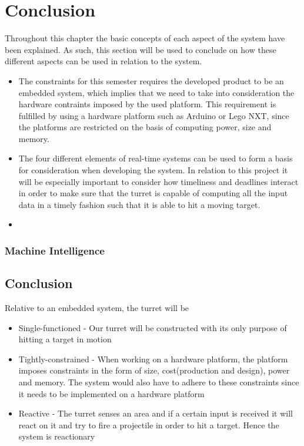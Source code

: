 \section{Conclusion}\label{EmbConc}

Throughout this chapter the basic concepts of each aspect of the system have
been explained. As such, this section will be used to conclude on how these
different aspects can be used in relation to the \name system.

\begin{itemize}
  \item The constraints for this semester requires the developed product to be
  an embedded system, which implies that we need to take into consideration
  the hardware contraints imposed by the used platform. This requirement is
  fulfilled by using a hardware platform such as Arduino or Lego NXT, since the
  platforms are restricted on the basis of computing power, size and memory.
  \item The four different elements of real-time systems can be used to form a
  basis for consideration when developing the system. In relation to this
  project it will be especially important to consider how timeliness and
  deadlines interact in order to make sure that the turret is capable of
  computing all the input data in a timely fashion such that it is able to hit a
  moving target.
  \item 
\end{itemize}

\subsubsection{Machine Intelligence}

\subsection{Conclusion}
Relative to an embedded system, the turret will be
\begin{itemize}
  \item Single-functioned - Our turret will be constructed with its only purpose of hitting a target in motion
  \item Tightly-constrained - When working on a hardware platform, the platform imposes constraints in the form of
  size, cost(production and design), power and memory. The system would also have to adhere to these constraints since it
  needs to be implemented on a hardware platform
  \item Reactive - The turret senses an area and if a certain input is received it will react on it and try to fire a projectile
  in order to hit a target. Hence the system is reactionary
\end{itemize}
